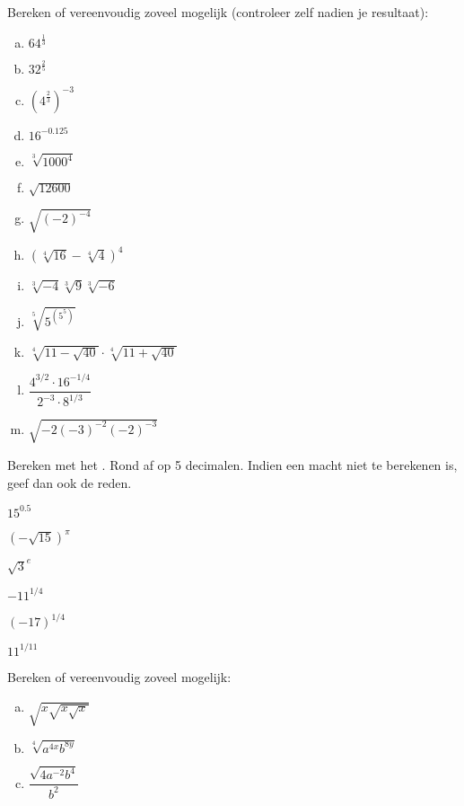 \documentclass[12pt,twoside]{article}
\begin{document}
\begin{oefening}
Bereken of vereenvoudig zoveel mogelijk (controleer zelf nadien je resultaat):
\begin{multicols}{3}
\begin{enumerate}[(a)]
  \item $64^{\frac{1}{3}}$
  \item $32^{\frac{2}{5}}$
  \item $\left(4^{\frac{2}{3}}\right)^{-3}$
  \item $16^{-0.125}$
  \item $\sqrt[3]{1000^4}$
  \item $\sqrt{12600}$
  \item $\sqrt{\left(-2\right)^{-4}}$
  \item $\left(\sqrt[4]{16}-\sqrt[4]{4}\right)^4$
  \item $\sqrt[3]{-4}\sqrt[3]{9}\sqrt[3]{-6}$
  \item $\sqrt[5]{5^{(5^5)}}$
  \item $\sqrt[4]{11-\sqrt{40}}\cdot\sqrt[4]{11+\sqrt{40}}$
  \item $\dfrac{4^{3/2}\cdot 16^{-1/4}}{2^{-3}\cdot 8^{1/3}}$
  \item $\sqrt{-2(-3)^{-2}(-2)^{-3}}$
\end{enumerate}
\end{multicols}
\end{oefening}

\begin{oefening}
Bereken met het . Rond af op 5 decimalen. Indien een macht niet te berekenen is, geef dan ook de reden.
\begin{exlist}{3}
  \item $15^{0.5}$
  \item $(-\sqrt{15})^{\pi}$
  \item $\sqrt{3}^e$
  \item $-11^{1/4}$
  \item $(-17)^{1/4}$
  \item $11^{1/11}$
\end{exlist}
\end{oefening}

\begin{oefening}
Bereken of vereenvoudig zoveel mogelijk:
\begin{multicols}{3}
\begin{enumerate}[(a)]
  \item $\sqrt{x\sqrt{x\sqrt{x}}}$
  \item $\sqrt[4]{a^{4x}b^{8y}}$
  \item $\dfrac{\sqrt{4a^{-2}b^4}}{b^2}$
\end{enumerate}
\end{multicols}
\end{oefening}
\end{document}
